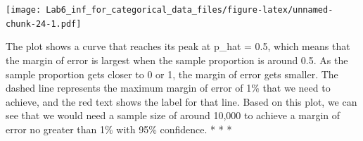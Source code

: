 \documentclass[
]{article}
\begin{document}
\texttt{[image: Lab6\_inf\_for\_categorical\_data\_files/figure-latex/unnamed-chunk-24-1.pdf]}

The plot shows a curve that reaches its peak at p\_hat = 0.5, which
means that the margin of error is largest when the sample proportion is
around 0.5. As the sample proportion gets closer to 0 or 1, the margin
of error gets smaller. The dashed line represents the maximum margin of
error of 1\% that we need to achieve, and the red text shows the label
for that line. Based on this plot, we can see that we would need a
sample size of around 10,000 to achieve a margin of error no greater
than 1\% with 95\% confidence. * * *
\end{document}
